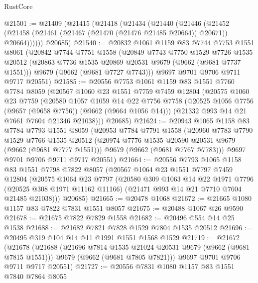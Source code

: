 \begin{lexlean}{RustCore}
\begin{coremodule}
@21501 := @21409
    (@21415
      (@21418
        (@21434
          (@21440
            (@21446
              (@21452 (@21458 (@21461 (@21467 (@21470 (@21476 @21485 @20664)) @20671)) @20664))))))
      @20685)
@21540 := @20832
    @1061
    @1159
    @83
    @7744
    @7753
    @1551
    @8061
    (@20842
      @7744
      @7751
      @1558
      (@20849
        @7743
        @7750
        @1529
        @7726
        @1535
        @20512
        (@20863 @7736 @1535 @20869 @20531 @9679 (@9662 (@9681 @7737 @1551)))
        @9679
        (@9662 (@9681 @7727 @7743)))
      @9697
      @9701
      @9706
      @9711
      @9717
      @20551)
@21585 := @20556
    @7753
    @1061
    @1159
    @83
    @1551
    @7760
    @7784
    @8059
    (@20567
      @1060
      @23
      @1551
      @7759
      @7459
      @12804
      (@20575
        @1060
        @23
        @7759
        (@20580
          @1057
          @1059
          @14
          @22
          @7756
          @7758
          (@20525 @1056 @7756 (@9657 (@9658 @7756)) (@9662 (@9664 @1056 @14)))
          (@21332 @993 @14 @21 @7661 @7604 @21346 @21038)))
      @20685)
@21624 := @20943
    @1065
    @1158
    @83
    @7784
    @7793
    @1551
    @8059
    (@20953
      @7784
      @7791
      @1558
      (@20960
        @7783
        @7790
        @1529
        @7766
        @1535
        @20512
        (@20974 @7776 @1535 @20590 @20531 @9679 (@9662 (@9681 @7777 @1551)))
        @9679
        (@9662 (@9681 @7767 @7783)))
      @9697
      @9701
      @9706
      @9711
      @9717
      @20551)
@21664 := @20556
    @7793
    @1065
    @1158
    @83
    @1551
    @7798
    @7822
    @8057
    (@20567
      @1064
      @23
      @1551
      @7797
      @7459
      @12804
      (@20575
        @1064
        @23
        @7797
        (@20580
          @309
          @1063
          @14
          @22
          @1971
          @7796
          (@20525 @308 @1971 @11162 @11166)
          (@21471 @993 @14 @21 @7710 @7604 @21485 @21038)))
      @20685)
@21665 := @20478 @1068
@21672 := @21665 @1080 @1157 @83 @7822 @7831 @1551 @8057
@21675 := @20488 @1067 @26 @9590
@21678 := @21675 @7822 @7829 @1558
@21682 := @20496 @554 @14 @25 @1538
@21688 := @21682 @7821 @7828 @1529 @7804 @1535 @20512
@21696 := @20495 @319 @104 @14 @11 @1991 @1551 @1568 @1529
@21719 := @21672
    (@21678
      (@21688
        (@21696 @7814 @1535 @21024 @20531 @9679 (@9662 (@9681 @7815 @1551)))
        @9679
        (@9662 (@9681 @7805 @7821)))
      @9697
      @9701
      @9706
      @9711
      @9717
      @20551)
@21727 := @20556 @7831 @1080 @1157 @83 @1551 @7840 @7864 @8055

\end{coremodule}
\end{lexlean}
